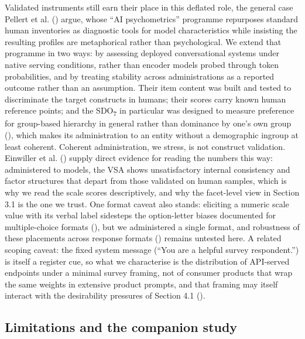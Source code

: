 \documentclass[
]{article}
\begin{document}
Validated instruments still earn their place in this deflated role, the
general case Pellert et al. () argue,
whose ``AI psychometrics'' programme repurposes standard human
inventories as diagnostic tools for model characteristics while
insisting the resulting profiles are metaphorical rather than
psychological. We extend that programme in two ways: by assessing
deployed conversational systems under native serving conditions, rather
than encoder models probed through token probabilities, and by treating
stability across administrations as a reported outcome rather than an
assumption. Their item content was built and tested to discriminate the
target constructs in humans; their scores carry known human reference
points; and the SDO\textsubscript{7} in particular was designed to
measure preference for group-based hierarchy in general rather than
dominance by one's own group (),
which makes its administration to an entity without a demographic
ingroup at least coherent. Coherent administration, we stress, is not
construct validation. Einwiller et al.
() supply direct evidence for reading
the numbers this way: administered to models, the VSA shows
unsatisfactory internal consistency and factor structures that depart
from those validated on human samples, which is why we read the scale
scores descriptively, and why the facet-level view in Section 3.1 is the
one we trust. One format caveat also stands: eliciting a numeric scale
value with its verbal label sidesteps the option-letter biases
documented for multiple-choice formats
(), but
we administered a single format, and robustness of these placements
across response formats () remains untested here. A related scoping caveat: the fixed system
message (``You are a helpful survey respondent.'') is itself a register
cue, so what we characterise is the distribution of API-served endpoints
under a minimal survey framing, not of consumer products that wrap the
same weights in extensive product prompts, and that framing may itself
interact with the desirability pressures of Section 4.1
().

\subsection{Limitations and the companion
study}\label{limitations-and-the-companion-study}
\end{document}
